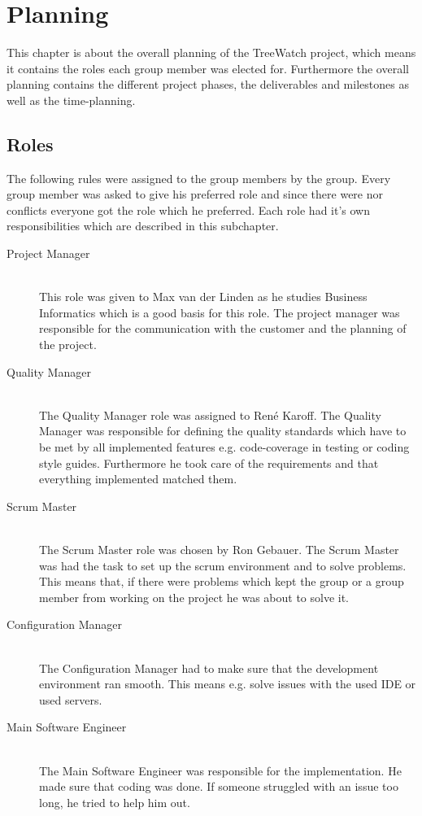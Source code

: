 \section{Planning}
This chapter is about the overall planning of the TreeWatch project, which means it contains the roles each group member was elected for. Furthermore the overall planning contains the different project phases, the deliverables and milestones as well as the time-planning.
\subsection{Roles}
The following rules were assigned to the group members by the group. Every group member was asked to give his preferred role and since there were nor conflicts everyone got the role which he preferred. Each role had it's own responsibilities which are described in this subchapter.
\begin{description}
	\item[Project Manager] \hfill \\
	This role was given to Max van der Linden as he studies Business Informatics which is a good basis for this role. The project manager was responsible for the communication with the customer and the planning of the project.
	\item[Quality Manager] \hfill \\
	The Quality Manager  role was assigned to René Karoff. The Quality Manager was responsible for defining the quality standards which have to be met by all implemented features e.g. code-coverage in testing or coding style guides. Furthermore he took care of the requirements and that everything implemented matched them.
	\item[Scrum Master] \hfill \\
	The Scrum Master role was chosen by Ron Gebauer. The Scrum Master was had the task to set up the scrum environment and to solve problems. This means that, if there were problems which kept the group or a group member from working on the project he was about to solve it.
	\item[Configuration Manager] \hfill \\
	The Configuration Manager had to make sure that the development environment ran smooth. This means e.g. solve issues with the used IDE or used servers.
	\item[Main Software Engineer] \hfill \\
	The Main Software Engineer was responsible for the implementation. He made sure that coding was done. If someone struggled with an issue too long, he tried to help him out.
\end{description}










